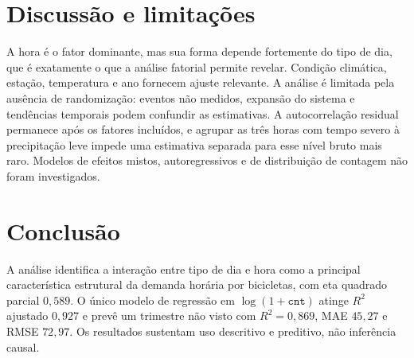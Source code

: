 \documentclass[12pt]{article}
\begin{document}
\section{Discussão e limitações}

A hora é o fator dominante, mas sua forma depende fortemente do tipo de dia, que
é exatamente o que a análise fatorial permite revelar. Condição climática,
estação, temperatura e ano fornecem ajuste relevante. A análise é limitada pela
ausência de randomização: eventos não medidos, expansão do sistema e tendências
temporais podem confundir as estimativas. A autocorrelação residual permanece
após os fatores incluídos, e agrupar as três horas com tempo severo à
precipitação leve impede uma estimativa separada para esse nível bruto mais
raro. Modelos de efeitos mistos, autoregressivos e de
distribuição de contagem não foram investigados.

\section{Conclusão}

A análise identifica a interação entre tipo de dia e hora como a principal
característica estrutural da demanda horária por bicicletas, com eta quadrado
parcial $0{,}589$. O único modelo de regressão em $\log(1+\texttt{cnt})$ atinge
$R^2$ ajustado $0{,}927$ e prevê um trimestre não visto com $R^2=0{,}869$,
MAE $45{,}27$ e RMSE $72{,}97$. Os resultados sustentam uso descritivo e
preditivo, não inferência causal.



\end{document}
